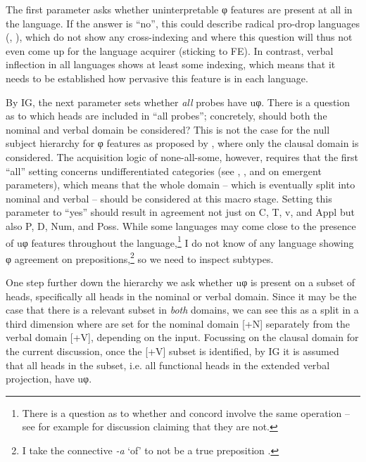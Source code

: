 \documentclass[output=paper]{langsci/langscibook}
\begin{document}
The first parameter asks whether uninterpretable φ features are present at all
in the language. If the answer is \enquote{no}, this could describe radical pro-drop
languages (\citealt{Saito2007},
\citealt{Roberts2010,Roberts2012,Roberts2014,Roberts2019}), which do
not show any cross-indexing and where this question will thus not even come up
for the language acquirer (sticking to \gls{FE}). In contrast, verbal inflection in
all  languages shows at least some indexing, which means that it needs to
be established how pervasive this feature is in each language.

By \gls{IG}, the next parameter sets whether \emph{all} probes have uφ. There
is a question as to which heads are included in \enquote{all probes}; concretely,
should both the nominal and verbal domain be considered? This is not the case
for the null subject hierarchy for φ features as proposed by
\citet{RobHol2010}, where only the clausal domain is considered. The
acquisition logic of none-all-some, however, requires that the first
\enquote{all}
setting concerns undifferentiated categories (see
\citealt{Biberauer2011,Biberauer2018}, \citealt{Bazalgette2015}, and
\citealt{BibRob2017} on emergent parameters), which means that the
whole domain – which is eventually split into nominal and verbal – should be
considered at this macro stage. Setting this parameter to \enquote{yes} should result in
agreement not just on C, T, v, and Appl but also P, D, Num, and Poss. While
some  languages may come close to the presence of uφ features throughout
the language,\footnote{There is a question as to whether  and concord
involve the same operation – see for example \citet{Giusti2008} for discussion
claiming that they are not.} I do not know of any  language showing φ
agreement on prepositions,\footnote{I take the  connective \emph{-a} ‘of’
to not be a true preposition \parencite{vandeVelde2013}.} so we need to inspect
subtypes.

One step further down the hierarchy we ask whether uφ is present on a subset of
heads, specifically all heads in the nominal or verbal domain. Since it may be
the case that there is a relevant subset in \emph{both} domains, we can see
this as a split in a third dimension where  are set for the nominal
domain [+N] separately from the verbal domain [+V], depending on the input.
Focussing on the clausal domain for the current discussion, once the [+V]
subset is identified, by \gls{IG} it is assumed that all heads in the subset, i.e.
all functional heads in the extended verbal projection, have uφ.
\end{document}
